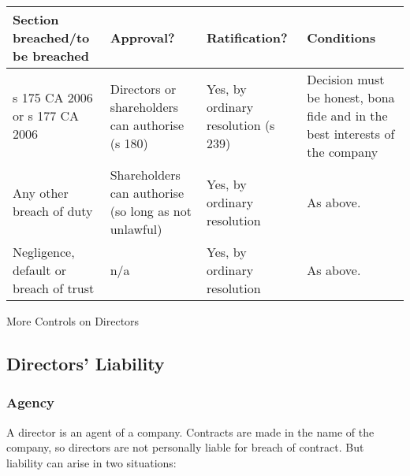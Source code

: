 \documentclass[
]{article}
\begin{document}
\begin{longtable}[]{@{}llll@{}}
\toprule()
Section breached/to be breached & Approval? & Ratification? &
Conditions \\
\midrule()
\endhead
s 175 CA 2006 or s 177 CA 2006 & Directors or shareholders can authorise
(s 180) & Yes, by ordinary resolution (s 239) & Decision must be honest,
bona fide and in the best interests of the company \\
Any other breach of duty & Shareholders can authorise (so long as not
unlawful) & Yes, by ordinary resolution & As above. \\
Negligence, default or breach of trust & n/a & Yes, by ordinary
resolution & As above. \\
\bottomrule()
\end{longtable}

More Controls on Directors

\hypertarget{directors-liability}{%
\subsection{Directors' Liability}\label{directors-liability}}

\hypertarget{agency}{%
\subsubsection{Agency}\label{agency}}

A director is an agent of a company. Contracts are made in the name of
the company, so directors are not personally liable for breach of
contract. But liability can arise in two situations:
\end{document}
